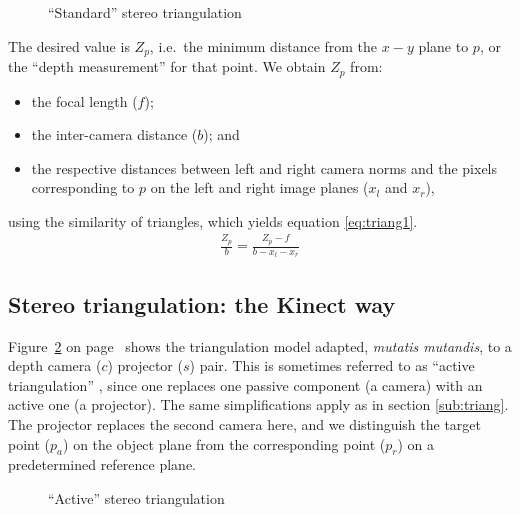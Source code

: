 \begin{figure}[ht]
    \begin{center}
        
        \caption{``Standard'' stereo triangulation}
        \label{fig:triang}
    \end{center}
\end{figure}

The desired value is $Z_{p}$, i.e.\ the minimum distance from the $x-y$ plane to
$p$, or the ``depth measurement'' for that point. We obtain $Z_{p}$ from: 

\begin{itemize}

    \item the focal length ($f$);

    \item the inter-camera distance ($b$); and 

    \item the respective distances between left and right camera norms and the
    pixels corresponding to $p$ on the left and right image planes ($x_{l}$ and
    $x_{r}$),

\end{itemize}

using the similarity of triangles, which yields equation
\ref{eq:triang1}.
\begin{align} \label{eq:triang1}
    \frac{Z_p}{b} = \frac{Z_p - f}{b - x_l - x_r}
\end{align}


\subsection{Stereo triangulation: the Kinect way}
\label{sub:atriang}

Figure~\ref{fig:atriang} on page~\pageref{fig:atriang} shows the triangulation
model adapted, \emph{mutatis mutandis}, to a depth camera ($c$) projector ($s$)
pair. This is sometimes referred to as ``active triangulation''
\cite{alexander1987}, since one replaces one passive component (a camera) with
an active one (a projector). The same simplifications apply as in section
\ref{sub:triang}. The projector replaces the second camera here, and we
distinguish the target point ($p_a$) on the object plane from the corresponding
point ($p_r$) on a predetermined reference plane.

\begin{figure}[ht]
    \begin{center}
        
        \caption{``Active'' stereo triangulation}
        \label{fig:atriang}
    \end{center}
\end{figure}

